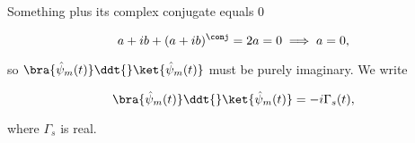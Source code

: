 Something plus its complex conjugate equals 0

\begin{equation}\label{eqn:qmTwoL8:470}
a + i b + (a + i b)^\conj = 2 a = 0 \implies a = 0,
\end{equation}

so $\bra{\hat{\psi}_m(t)} \ddt{} \ket{\hat{\psi}_m(t)}$ must be purely imaginary.  We write

\begin{equation}\label{eqn:qmTwoL8:490}
\bra{\hat{\psi}_m(t)} \ddt{} \ket{\hat{\psi}_m(t)} = -i \Gamma_s(t),
\end{equation}

where $\Gamma_s$ is real.

\EndArticle
